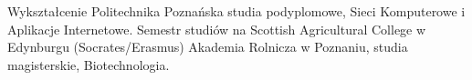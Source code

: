 \begin{rubric}{Wykształcenie}
Politechnika Poznańska studia podyplomowe,
	Sieci Komputerowe i Aplikacje Internetowe.
Semestr studiów na Scottish Agricultural
College w Edynburgu (Socrates/Erasmus)
\entry*[2001 -- 2006]Akademia Rolnicza w Poznaniu, studia magisterskie,
	Biotechnologia.
\end{rubric}
